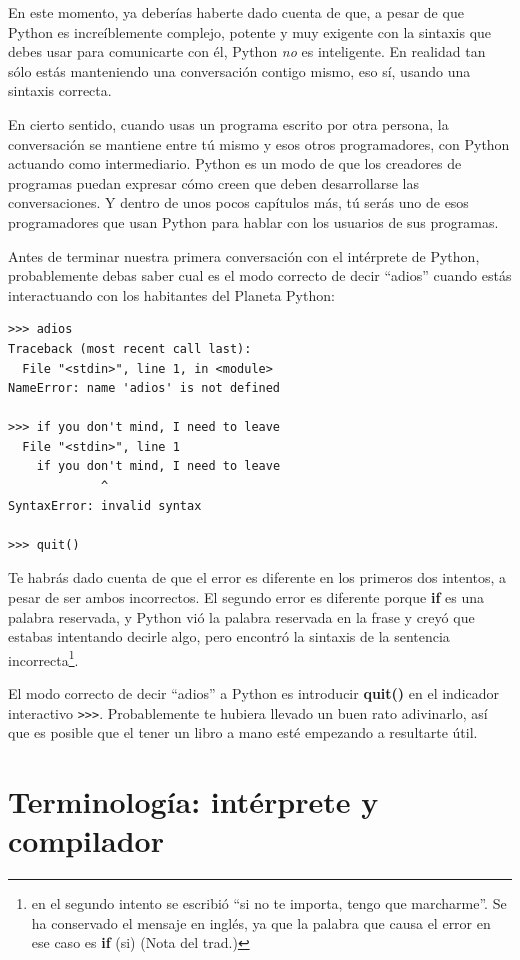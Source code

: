 En este momento, ya deberías haberte dado cuenta de que, a pesar de que Python
es increíblemente complejo, potente y muy exigente con
la sintaxis que debes usar para comunicarte con él, Python {\em no} es
inteligente. En realidad tan sólo estás manteniendo una conversación
contigo mismo, eso sí, usando una sintaxis correcta.

En cierto sentido, cuando usas un programa escrito por otra persona,
la conversación se mantiene entre tú mismo y esos otros programadores,
con Python actuando como intermediario. Python es un
modo de que los creadores de programas puedan expresar cómo creen
que deben desarrollarse las conversaciones. Y dentro
de unos pocos capítulos más, tú serás uno de esos programadores
que usan Python para hablar con los usuarios de sus programas.

Antes de terminar nuestra primera conversación con el intérprete
de Python, probablemente debas saber cual es el modo correcto
de decir ``adios'' cuando estás interactuando con los
habitantes del Planeta Python:

\beforeverb
\begin{verbatim}
>>> adios
Traceback (most recent call last):
  File "<stdin>", line 1, in <module>
NameError: name 'adios' is not defined

>>> if you don't mind, I need to leave
  File "<stdin>", line 1
    if you don't mind, I need to leave
             ^
SyntaxError: invalid syntax

>>> quit()
\end{verbatim}
\afterverb
%
Te habrás dado cuenta de que el error es diferente en los primeros
dos intentos, a pesar de ser ambos incorrectos. El segundo error es diferente porque
{\bf if} es una palabra reservada, y Python vió la palabra
reservada en la frase y creyó que estabas intentando decirle algo, pero encontró
la sintaxis de la sentencia incorrecta\footnote{en el segundo intento se escribió ``si no te importa,
tengo que marcharme''. Se ha conservado el mensaje en inglés, ya que la palabra que causa el error en
ese caso es {\bf if} (si) (Nota del trad.)}.

El modo correcto de decir ``adios'' a Python es introducir
{\bf quit()} en el indicador interactivo {\tt \verb">>>"}.
Probablemente te hubiera llevado un buen rato adivinarlo,
así que es posible que el tener un libro a mano
esté empezando a resultarte útil.

\section{Terminología: intérprete y compilador}

